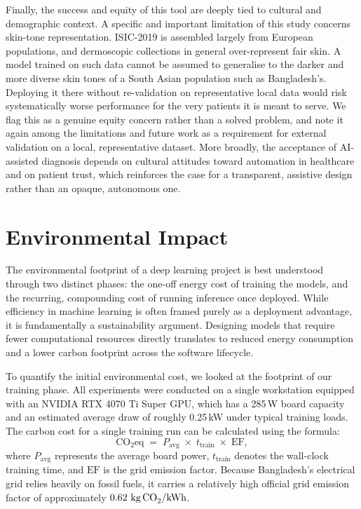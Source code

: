 Finally, the success and equity of this tool are deeply tied to cultural and demographic context. A specific and important limitation of this study concerns skin-tone representation. ISIC-2019 is assembled largely from European populations, and dermoscopic collections in general over-represent fair skin. A model trained on such data cannot be assumed to generalise to the darker and more diverse skin tones of a South Asian population such as Bangladesh's. Deploying it there without re-validation on representative local data would risk systematically worse performance for the very patients it is meant to serve. We flag this as a genuine equity concern rather than a solved problem, and note it again among the limitations and future work as a requirement for external validation on a local, representative dataset. More broadly, the acceptance of AI-assisted diagnosis depends on cultural attitudes toward automation in healthcare and on patient trust, which reinforces the case for a transparent, assistive design rather than an opaque, autonomous one.

\section{Environmental Impact}
\label{sec:environmental_impact}

The environmental footprint of a deep learning project is best understood through two distinct phases: the one-off energy cost of training the models, and the recurring, compounding cost of running inference once deployed. While efficiency in machine learning is often framed purely as a deployment advantage, it is fundamentally a sustainability argument. Designing models that require fewer computational resources directly translates to reduced energy consumption and a lower carbon footprint across the software lifecycle.

To quantify the initial environmental cost, we looked at the footprint of our training phase. All experiments were conducted on a single workstation equipped with an NVIDIA RTX 4070 Ti Super GPU, which has a 285\,W board capacity and an estimated average draw of roughly 0.25\,kW under typical training loads. The carbon cost for a single training run can be calculated using the formula:
\[
\text{CO}_2\text{eq} \;=\; P_{\text{avg}} \;\times\; t_{\text{train}} \;\times\; \text{EF},
\]
where $P_{\text{avg}}$ represents the average board power, $t_{\text{train}}$ denotes the wall-clock training time, and $\text{EF}$ is the grid emission factor. Because Bangladesh’s electrical grid relies heavily on fossil fuels, it carries a relatively high official grid emission factor of approximately $0.62\ \text{kg\,CO}_2/\text{kWh}$. 

